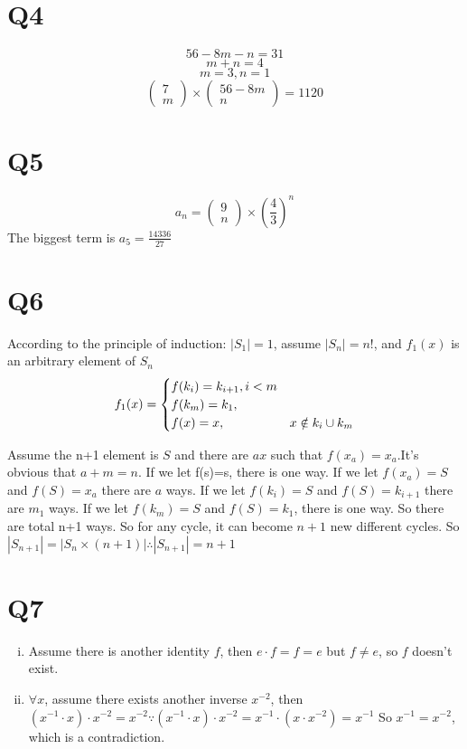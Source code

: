 \documentclass[12pt]{article}
\begin{document}
\section{Q4}
$$56-8m-n=31$$
$$m+n=4$$
$$m=3,n=1$$
$$\begin{pmatrix}
7\\m
\end{pmatrix}\times\begin{pmatrix}
56-8m\\n
\end{pmatrix}=1120$$
\section{Q5}
$$a_n=\begin{pmatrix}
9\\n
\end{pmatrix}\times(\dfrac{4}{3})^n$$
The biggest term is $a_5=\frac{14336}{27}$
\section{Q6}
According to the principle of induction:
$|S_1|=1$, assume $|S_n|=n!$, and $f_1(x)$ is an arbitrary element of $S_n$ 
\begin{eqnarray}f_1(x)=
\begin{cases}
f(k_i)=k_{i+1} ,i<m\cr f(k_m)=k_1, \cr f(x)=x, &x\notin k_i\cup k_m\end{cases}
\end{eqnarray}
\par Assume the n+1 element is $S$ and there are $ax$ such that $f(x_a)=x_a$.It's obvious that $a+m=n$.   
If we let f(s)=s, there is one way. If we let $f(x_a)=S$ and $f(S)=x_a$ there are $a$ ways. If we let $f(k_i)=S$ and $f(S)=k_{i+1}$ there are $m_1$ ways. If we let $f(k_m)=S$ and $f(S)=k_1$, there is one way. So there are total n+1 ways. So for any cycle, it can become $n+1$ new different cycles. So $|S_{n+1}|=|S_{n}\times (n+1)|\therefore |S_{n+1}|=n+1$
\section{Q7}
\begin{enumerate}[(i)]
\item Assume there is another identity $f$, then $e\cdot f=f=e$ but $f\neq e$, so $f$ doesn't exist.
\item $\forall x$, assume there exists another inverse $x^{-2}$, then $(x^{-1}\cdot x)\cdot x^{-2}=x^{-2}\because (x^{-1}\cdot x)\cdot x^{-2}=x^{-1}\cdot(x\cdot x^{-2})=x^{-1}$
So $x^{-1}=x^{-2}$, which is a contradiction. 
\end{enumerate}
\end{document}
